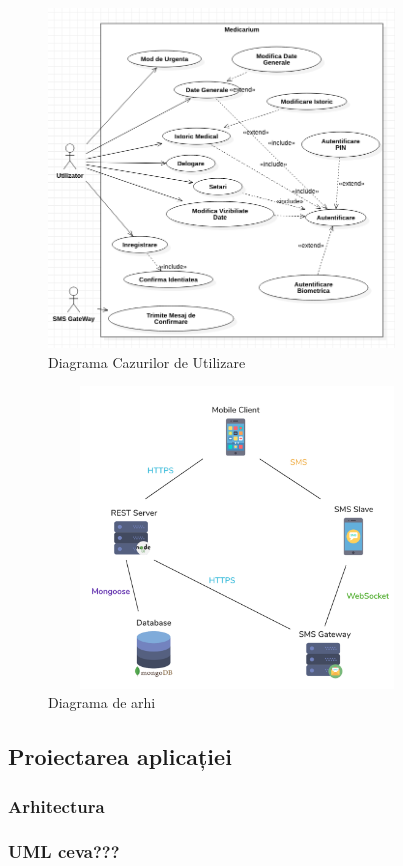 \documentclass[12pt]{article}
\begin{document}
\begin{figure}[H]
\centering
\includegraphics[height=9cm]{cazuri.png}
\caption{Diagrama Cazurilor de Utilizare}
\end{figure}


\begin{figure}[H]
\centering
\includegraphics[width=10cm, height=8cm]{arhi.png}
\caption{Diagrama de arhi}
\end{figure}


\subsection{Proiectarea aplicației}
\subsubsection{Arhitectura}
\subsubsection{UML ceva???}
\end{document}
